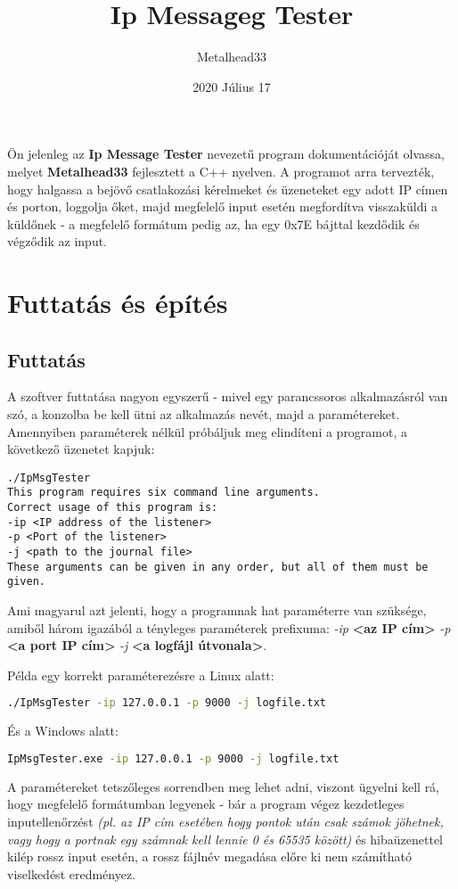 \documentclass[openany,10pt,a4paper]{book}
\title{Ip Messageg Tester}
\author{Metalhead33}
\date{2020 Július 17}
\begin{document}
\maketitle
Ön jelenleg az \textbf{Ip Message Tester} nevezetű program dokumentációját olvassa, melyet \textbf{Metalhead33} fejlesztett a C++ nyelven. A programot arra tervezték, hogy halgassa a bejövő csatlakozási kérelmeket és üzeneteket egy adott IP címen és porton, loggolja őket, majd megfelelő input esetén megfordítva visszaküldi a küldőnek - a megfelelő formátum pedig az, ha egy 0x7E bájttal kezdődik és végződik az input.
\tableofcontents
\section{Futtatás és építés}
\subsection{Futtatás}
A szoftver futtatása nagyon egyszerű - mivel egy parancssoros alkalmazásról van szó, a konzolba be kell ütni az alkalmazás nevét, majd a paramétereket. Amennyiben paraméterek nélkül próbáljuk meg elindíteni a programot, a következő üzenetet kapjuk:

\begin{lstlisting}
./IpMsgTester
This program requires six command line arguments.
Correct usage of this program is:
-ip <IP address of the listener>
-p <Port of the listener>
-j <path to the journal file>
These arguments can be given in any order, but all of them must be given.
\end{lstlisting}

Ami magyarul azt jelenti, hogy a programnak hat paraméterre van szüksége, amiből három igazából a tényleges paraméterek prefixuma: \textit{-ip} \textbf{<az IP cím>} \textit{-p} \textbf{<a port IP cím>} \textit{-j} \textbf{<a logfájl útvonala>}.

Példa egy korrekt paraméterezésre a Linux alatt:

\begin{lstlisting}[language=bash]
./IpMsgTester -ip 127.0.0.1 -p 9000 -j logfile.txt
\end{lstlisting}

És a Windows alatt:

\begin{lstlisting}[language=bash]
IpMsgTester.exe -ip 127.0.0.1 -p 9000 -j logfile.txt
\end{lstlisting}

A paramétereket tetszőleges sorrendben meg lehet adni, viszont ügyelni kell rá, hogy megfelelő formátumban legyenek - bár a program végez kezdetleges inputellenőrzést \textit{(pl. az IP cím esetében hogy pontok után csak számok jöhetnek, vagy hogy a portnak egy számnak kell lennie 0 és 65535 között)} és hibaüzenettel kilép rossz input esetén, a rossz fájlnév megadása előre ki nem számítható viselkedést eredményez.
\end{document}
